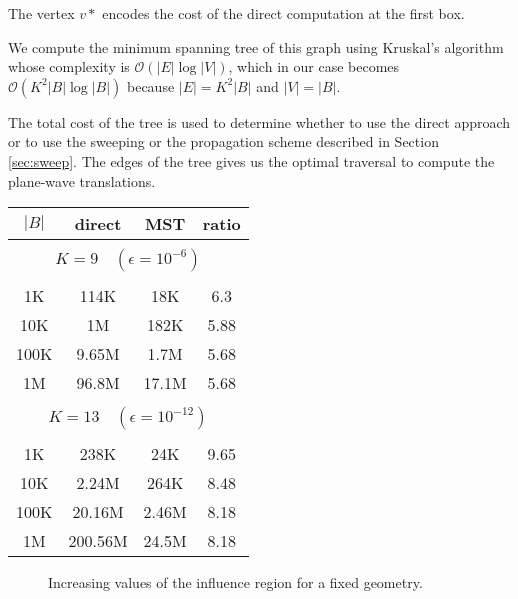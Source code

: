 The vertex $v*$ encodes the cost of the direct computation at the first box. 

We compute the minimum spanning tree of this graph using Kruskal's algorithm \cite{kruskal56} whose complexity is $\mathcal{O}(|E| \log |V|)$, which in our case becomes $\mathcal{O}(K^2 |B| \log |B|)$ because $|E| = K^2 |B|$ and $|V| = |B|$.
 

The total cost of the tree is used to determine whether to use the direct approach or to use the sweeping or the propagation scheme described in Section \ref{sec:sweep}. The edges of the tree gives us the optimal traversal to compute the plane-wave translations.
\begin{table}
\centering
\begin{tabular}{cccc} \hline
        $|B|$  &  direct & MST & ratio \\ \hline       
        \multicolumn{4}{c}{}  \\
        \multicolumn{4}{c}{ {\small $K =  9 \quad (\epsilon = 10^{-6})$}}  \\
        \multicolumn{4}{c}{}  \\
         1K & 114K & 18K & 6.3 \\  
        10K & 1M & 182K & 5.88 \\  
       100K & 9.65M & 1.7M & 5.68 \\  
       1M & 96.8M & 17.1M & 5.68 \\  
       \multicolumn{4}{c}{}  \\
       \multicolumn{4}{c}{ {\small $K =  13 \quad (\epsilon = 10^{-12})$}}  \\
       \multicolumn{4}{c}{}  \\
             1K & 238K & 24K & 9.65 \\  
        10K & 2.24M & 264K & 8.48 \\  
        100K & 20.16M & 2.46M & 8.18 \\  
       1M &   200.56M & 24.5M & 8.18 \\   
\hline
\end{tabular}
\end{table}

\begin{figure}
  \caption{Increasing values of the influence region for a fixed geometry.}  
\end{figure}  





